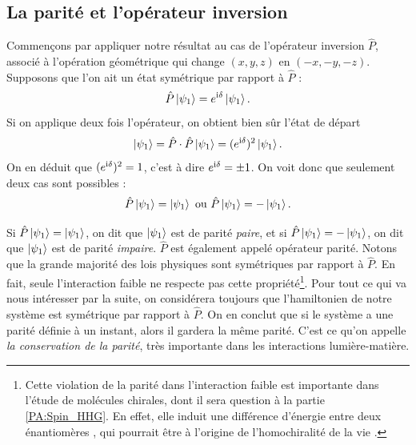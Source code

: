 \subsection{La parité et l'opérateur inversion}
Commençons par appliquer notre résultat au cas de l'opérateur inversion $\hat{P}$, associé à l'opération géométrique qui change $(x,y,z)$ en $(-x,-y,-z)$. Supposons que l'on ait un état symétrique par rapport à $\hat{P}$ : 
\begin{equation}
\hat{P}\ket{\psi_1} = e^{\mathrm{i}\delta}\ket{\psi_1}.
\end{equation}
Si on applique deux fois l'opérateur, on obtient bien sûr l'état de départ
\begin{equation}
\ket{\psi_1} = \hat{P}\cdot\hat{P}\ket{\psi_1} = (e^{\mathrm{i}\delta})^2\ket{\psi_1}.
\end{equation}
On en déduit que $(e^{\mathrm{i}\delta})^2=1$, c'est à dire $e^{\mathrm{i}\delta}=\pm1$. On voit donc que seulement deux cas sont possibles :
\begin{equation}
\hat{P}\ket{\psi_1} = \ket{\psi_1} \mbox{ ou } \hat{P}\ket{\psi_1} = -\ket{\psi_1}.
\end{equation}

Si $\hat{P}\ket{\psi_1}= \ket{\psi_1}$, on dit que $\ket{\psi_1}$ est de parité \textit{paire}, et si $\hat{P}\ket{\psi_1}= -\ket{\psi_1}$, on dit que $\ket{\psi_1}$ est de parité \textit{impaire}. $\hat{P}$ est également appelé opérateur parité. Notons que la grande majorité des lois physiques sont symétriques par rapport à $\hat{P}$. En fait, seule l'interaction faible ne respecte pas cette propriété\footnote{Cette violation de la parité dans l'interaction faible est importante dans l'étude de molécules chirales, dont il sera question à la partie \ref{PA:Spin_HHG}. En effet, elle induit une différence d'énergie entre deux énantiomères , qui pourrait être à l'origine de l'homochiralité de la vie .}. Pour tout ce qui va nous intéresser par la suite, on considérera toujours que l'hamiltonien de notre système est symétrique par rapport à $\hat{P}$. On en conclut que si le système a une parité définie à un instant, alors il gardera la même parité. C'est ce qu'on appelle \textit{la conservation de la parité}, très importante dans les interactions lumière-matière.

